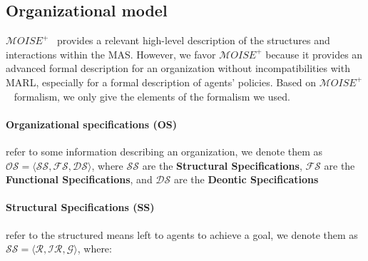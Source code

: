 \documentclass[runningheads]{llncs}
\begin{document}
\subsection{Organizational model}

$\mathcal{M}OISE^+$~\cite{Hubner2007} provides a relevant high-level description of the structures and interactions within the MAS. However, we favor $\mathcal{M}OISE^+$ because it provides an advanced formal description for an organization without incompatibilities with MARL, especially for a formal description of agents' policies.
Based on $\mathcal{M}OISE^+$~\cite{Hubner2007} formalism, we only give the elements of the formalism we used.

\paragraph{\textbf{Organizational specifications (OS)}} refer to some information describing an organization, we denote them as $\mathcal{OS} = \langle \mathcal{SS}, \mathcal{FS}, \mathcal{DS} \rangle$, where $\mathcal{SS}$ are the \textbf{Structural Specifications}, $\mathcal{FS}$ are the \textbf{Functional Specifications}, and $\mathcal{DS}$ are the \textbf{Deontic Specifications}

\paragraph{\textbf{Structural Specifications (SS)}} refer to the structured means left to agents to achieve a goal, we denote them as $\mathcal{SS} = \langle \mathcal{R}, \mathcal{IR}, \mathcal{G} \rangle$, where:
\end{document}
